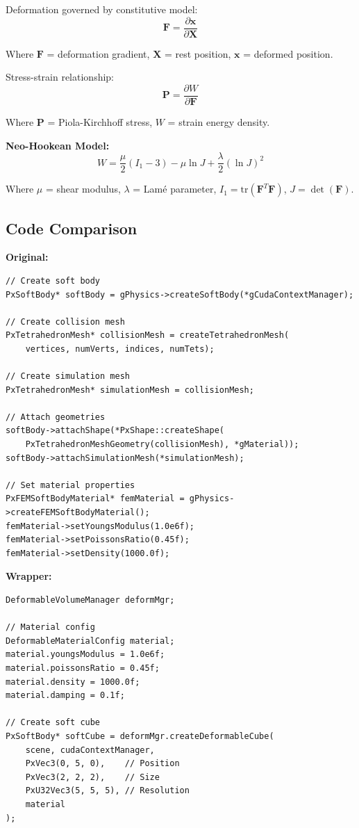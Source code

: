 Deformation governed by constitutive model:
\begin{equation}
\mathbf{F} = \frac{\partial \mathbf{x}}{\partial \mathbf{X}}
\end{equation}

Where $\mathbf{F}$ = deformation gradient, $\mathbf{X}$ = rest position, $\mathbf{x}$ = deformed position.

Stress-strain relationship:
\begin{equation}
\mathbf{P} = \frac{\partial W}{\partial \mathbf{F}}
\end{equation}

Where $\mathbf{P}$ = Piola-Kirchhoff stress, $W$ = strain energy density.

\textbf{Neo-Hookean Model:}
\begin{equation}
W = \frac{\mu}{2}(I_1 - 3) - \mu \ln J + \frac{\lambda}{2}(\ln J)^2
\end{equation}

Where $\mu$ = shear modulus, $\lambda$ = Lamé parameter, $I_1 = \text{tr}(\mathbf{F}^T\mathbf{F})$, $J = \det(\mathbf{F})$.


\subsection{Code Comparison}

\textbf{Original:}
\begin{lstlisting}[caption={Manual FEM setup}]
// Create soft body
PxSoftBody* softBody = gPhysics->createSoftBody(*gCudaContextManager);

// Create collision mesh
PxTetrahedronMesh* collisionMesh = createTetrahedronMesh(
    vertices, numVerts, indices, numTets);

// Create simulation mesh
PxTetrahedronMesh* simulationMesh = collisionMesh;

// Attach geometries
softBody->attachShape(*PxShape::createShape(
    PxTetrahedronMeshGeometry(collisionMesh), *gMaterial));
softBody->attachSimulationMesh(*simulationMesh);

// Set material properties
PxFEMSoftBodyMaterial* femMaterial = gPhysics->createFEMSoftBodyMaterial();
femMaterial->setYoungsModulus(1.0e6f);
femMaterial->setPoissonsRatio(0.45f);
femMaterial->setDensity(1000.0f);
\end{lstlisting}

\textbf{Wrapper:}
\begin{lstlisting}[caption={Config-driven soft body}]
DeformableVolumeManager deformMgr;

// Material config
DeformableMaterialConfig material;
material.youngsModulus = 1.0e6f;
material.poissonsRatio = 0.45f;
material.density = 1000.0f;
material.damping = 0.1f;

// Create soft cube
PxSoftBody* softCube = deformMgr.createDeformableCube(
    scene, cudaContextManager,
    PxVec3(0, 5, 0),    // Position
    PxVec3(2, 2, 2),    // Size
    PxU32Vec3(5, 5, 5), // Resolution
    material
);
\end{lstlisting}

